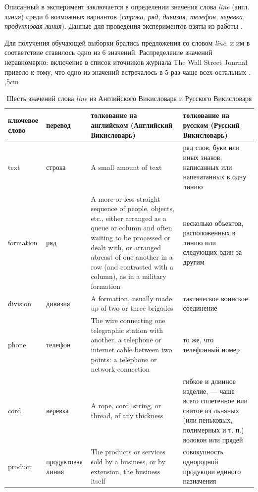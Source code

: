 \documentclass{article}
\begin{document}
\begin{articletext}
Описанный в \cite{Mooney 1996} эксперимент заключается в определении значения слова \textit{line} (англ. \textit{линия}) среди 6 возможных вариантов (\textit{строка, ряд, дивизия, телефон, веревка, продуктовая линия}). Данные для проведения экспериментов взяты из работы \cite{Leacock 1993}.  

Для получения обучающей выборки брались предложения со словом \textit{line}, и им в соответствие ставилось одно из 6 значений. Распределение значений неравномерно: включение в список иточников журнала The Wall Street Journal привело к тому, что одно из значений встречалось в 5 раз чаще всех остальных \cite{Leacock 1993}.
,5cm

\bfullwidth
\begin{table}[H]
\centering
\caption{Шесть значений слова \textit{line} из Английского Викисловаря и Русского Викисловаря}
\begin{tabular}{|m{2cm}|m{2cm}|m{6cm}|m{4cm}|}

\hline
\textbf{ключевое слово} & \textbf{перевод} & \textbf{толкование на английском (Английский Викисловарь)} & \textbf{толкование на русском (Русский Викисловарь)}\\
\hline
text & строка & A small amount of text & ряд слов, букв или иных знаков, написанных или напечатанных в одну линию \\
\hline
formation & ряд & A more-or-less straight sequence of people, objects, etc., either arranged as a queue or column and often waiting to be processed or dealt with, or arranged abreast of one another in a row (and contrasted with a column), as in a military formation & несколько объектов, расположенных в линию или следующих один за другим\\
\hline
division & дивизия & A formation, usually made up of two or three brigades & тактическое воинское соединение \\
\hline
phone & телефон & The wire connecting one telegraphic station with another, a telephone or internet cable between two points: a telephone or network connection & то же, что телефонный номер \\
\hline
cord & веревка & A rope, cord, string, or thread, of any thickness  & гибкое и длинное изделие, — чаще всего сплетенное или свитое из льняных (или пеньковых, полимерных и т. п.) волокон или прядей \\
\hline
product & продуктовая линия & The products or services sold by a business, or by extension, the business itself & совокупность однородной продукции единого назначения  \\
\hline
\end{tabular}
\label{tbl5}
\end{table}
\efullwidth


\end{articletext}
\end{document}
